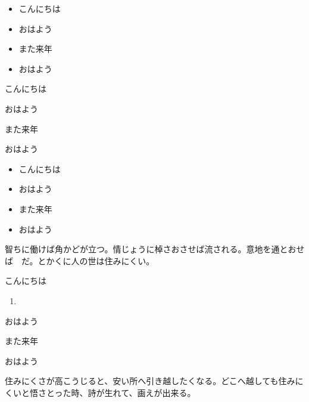 \documentclass[book, twoside, paper=b5j, fleqn, jafontsize=9pt, jafontscale=1, head_space=22mm, foot_space=9mm, fore-edge=16mm, gutter=25mm, hanging_punctuation]{jlreq}
\newenvironment{framebox-key}{\begin{simplesquarebox}{\gothic{KEY}}}{\end{simplesquarebox}}
\newcommand{\blankbox}[1]{~\boxed{\phantom{aa}{\textgt{#1}}\phantom{aa}}~}
\newenvironment{enumerate-brackets}{\begin{enumerate}\renewcommand{\labelenumi}{\ajKakko{\arabic{enumi}}~}}{\end{enumerate}}
\begin{document}
\newpage
\begin{framebox-key}
    \begin{itemize}
        \item こんにちは
        \item おはよう
        \item また来年
        \item おはよう
    \end{itemize}
    \begin{enumerate-brackets}
        \item こんにちは
        \item おはよう
        \item また来年
        \item おはよう
    \end{enumerate-brackets}
\end{framebox-key}

\begin{itemize}
    \item こんにちは
    \item おはよう
    \item また来年
    \item おはよう
\end{itemize}

智ちに働けば角かどが立つ。情じょうに棹さおさせば流される。意地を通とおせば\blankbox{1}だ。とかくに人の世は住みにくい。

\begin{enumerate-brackets}
    \item こんにちは
    \begin{enumerate}
        \item 
    \end{enumerate}
    \item おはよう
    \item また来年
    \item おはよう
\end{enumerate-brackets}

住みにくさが高こうじると、安い所へ引き越したくなる。どこへ越しても住みにくいと悟さとった時、詩が生れて、画えが出来る。
\end{document}
